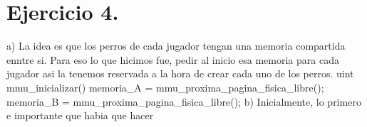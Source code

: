 \section{Ejercicio 4.}
a)
La idea es que los perros de cada jugador tengan una memoria compartida enntre si.
Para eso lo que hicimos fue, pedir al inicio esa memoria para cada jugador asi la tenemos reservada a la hora de crear cada uno de los perros.
uint mmu_inicializar() {
    memoria_A = mmu_proxima_pagina_fisica_libre();
    memoria_B = mmu_proxima_pagina_fisica_libre();
}
b)
Inicialmente, lo primero e importante que habia que hacer


